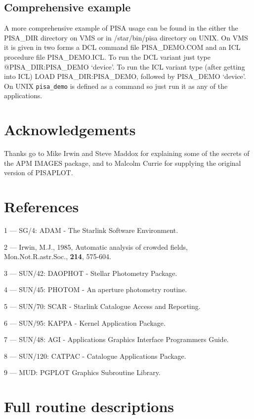 \subsection{Comprehensive example}

A more comprehensive example of PISA usage can be found in the either
the PISA\_DIR directory on VMS or in /star/bin/pisa directory on UNIX.
On VMS it is given in two forms a DCL command file PISA\_DEMO.COM and an
ICL procedure file PISA\_DEMO.ICL. To run the DCL variant just type
@PISA\_DIR:PISA\_DEMO `device'. To run the ICL variant type (after
getting into ICL) LOAD PISA\_DIR:PISA\_DEMO, followed by  PISA\_DEMO
`device'. On UNIX \verb+pisa_demo+ is defined as a command so just run it as
any of the applications.


\section{Acknowledgements}

Thanks go to Mike Irwin and Steve Maddox for explaining some of the
secrets of the APM IMAGES package, and to Malcolm Currie for supplying
the original version of PISAPLOT.

\section{References}

1 --- SG/4: ADAM - The Starlink Software Environment.

2 --- Irwin, M.J., 1985, Automatic analysis of crowded fields, \\
\hspace*{2.0em} Mon.Not.R.astr.Soc., {\bf 214}, 575-604.

3 --- SUN/42: DAOPHOT - Stellar Photometry Package.

4 --- SUN/45: PHOTOM - An aperture photometry routine.

5 --- SUN/70: SCAR - Starlink Catalogue Access and Reporting.

6 --- SUN/95: KAPPA - Kernel Application Package.

7 --- SUN/48: AGI - Applications Graphics Interface Programmers Guide.

8 --- SUN/120: CATPAC - Catalogue Applications Package.

9 --- MUD: PGPLOT Graphics Subroutine Library.

\newpage
\appendix
\section{Full routine descriptions}
\label{fulldescriptions}

